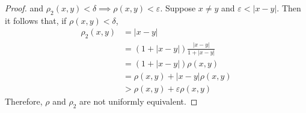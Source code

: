 \documentclass{article}
\begin{document}
\begin{enumerate}
\begin{enumerate}
\begin{proof}
                              and $\rho_2(x,y)<\delta\implies\rho(x,y)<\varepsilon$.
                              Suppose $x\neq y$ and $\varepsilon < \lvert x-y\rvert$.
                              Then it follows that, if $\rho(x,y)<\delta$,
                              \begin{align*}
                                    \rho_2(x,y) & = \lvert x-y\rvert                                                \\
                                                & = (1+\lvert x-y\rvert)\frac{\lvert x-y\rvert}{1+\lvert x-y\rvert} \\
                                                & = (1+\lvert x-y\rvert)\rho(x,y)                                   \\
                                                & = \rho(x,y) + \lvert x-y\rvert\rho(x,y)                           \\
                                                & > \rho(x,y) + \varepsilon\rho(x,y)
                              \end{align*}
                              Therefore, $\rho$ and $\rho_2$ are not uniformly equivalent.
                        \end{proof}
            \end{enumerate}
\end{enumerate}
\end{document}
